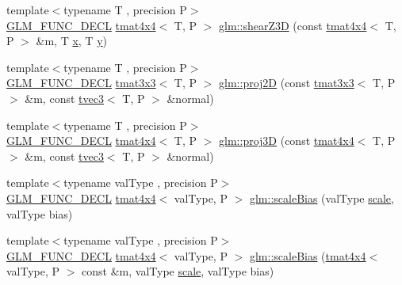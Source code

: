 \begin{DoxyCompactItemize}
\item 
{\footnotesize template$<$typename T , precision P$>$ }\\\mbox{\hyperlink{setup_8hpp_ab2d052de21a70539923e9bcbf6e83a51}{G\+L\+M\+\_\+\+F\+U\+N\+C\+\_\+\+D\+E\+CL}} \mbox{\hyperlink{structglm_1_1tmat4x4}{tmat4x4}}$<$ T, P $>$ \mbox{\hyperlink{group__gtx__transform2_ga5558ac64a7144685bf2eb4483a0e2f51}{glm\+::shear\+Z3D}} (const \mbox{\hyperlink{structglm_1_1tmat4x4}{tmat4x4}}$<$ T, P $>$ \&m, T \mbox{\hyperlink{glad_8h_a92d0386e5c19fb81ea88c9f99644ab1d}{x}}, T \mbox{\hyperlink{glad_8h_a66ddd433d2cacfe27f5906b7e86faeed}{y}})
\item 
{\footnotesize template$<$typename T , precision P$>$ }\\\mbox{\hyperlink{setup_8hpp_ab2d052de21a70539923e9bcbf6e83a51}{G\+L\+M\+\_\+\+F\+U\+N\+C\+\_\+\+D\+E\+CL}} \mbox{\hyperlink{structglm_1_1tmat3x3}{tmat3x3}}$<$ T, P $>$ \mbox{\hyperlink{group__gtx__transform2_gacfce1085167a8bfb71a55ea14d22752f}{glm\+::proj2D}} (const \mbox{\hyperlink{structglm_1_1tmat3x3}{tmat3x3}}$<$ T, P $>$ \&m, const \mbox{\hyperlink{structglm_1_1tvec3}{tvec3}}$<$ T, P $>$ \&normal)
\item 
{\footnotesize template$<$typename T , precision P$>$ }\\\mbox{\hyperlink{setup_8hpp_ab2d052de21a70539923e9bcbf6e83a51}{G\+L\+M\+\_\+\+F\+U\+N\+C\+\_\+\+D\+E\+CL}} \mbox{\hyperlink{structglm_1_1tmat4x4}{tmat4x4}}$<$ T, P $>$ \mbox{\hyperlink{group__gtx__transform2_gafab0418f2503ec2133cb2de828cc482a}{glm\+::proj3D}} (const \mbox{\hyperlink{structglm_1_1tmat4x4}{tmat4x4}}$<$ T, P $>$ \&m, const \mbox{\hyperlink{structglm_1_1tvec3}{tvec3}}$<$ T, P $>$ \&normal)
\item 
{\footnotesize template$<$typename val\+Type , precision P$>$ }\\\mbox{\hyperlink{setup_8hpp_ab2d052de21a70539923e9bcbf6e83a51}{G\+L\+M\+\_\+\+F\+U\+N\+C\+\_\+\+D\+E\+CL}} \mbox{\hyperlink{structglm_1_1tmat4x4}{tmat4x4}}$<$ val\+Type, P $>$ \mbox{\hyperlink{group__gtx__transform2_ga2874abd228989556d610a0bff993667a}{glm\+::scale\+Bias}} (val\+Type \mbox{\hyperlink{group__gtc__matrix__transform_ga8f062fcc07e2445500793f2803afebb0}{scale}}, val\+Type bias)
\item 
{\footnotesize template$<$typename val\+Type , precision P$>$ }\\\mbox{\hyperlink{setup_8hpp_ab2d052de21a70539923e9bcbf6e83a51}{G\+L\+M\+\_\+\+F\+U\+N\+C\+\_\+\+D\+E\+CL}} \mbox{\hyperlink{structglm_1_1tmat4x4}{tmat4x4}}$<$ val\+Type, P $>$ \mbox{\hyperlink{group__gtx__transform2_gac1a1139e2980021422d1fc1c42dc74f2}{glm\+::scale\+Bias}} (\mbox{\hyperlink{structglm_1_1tmat4x4}{tmat4x4}}$<$ val\+Type, P $>$ const \&m, val\+Type \mbox{\hyperlink{group__gtc__matrix__transform_ga8f062fcc07e2445500793f2803afebb0}{scale}}, val\+Type bias)
\end{DoxyCompactItemize}


